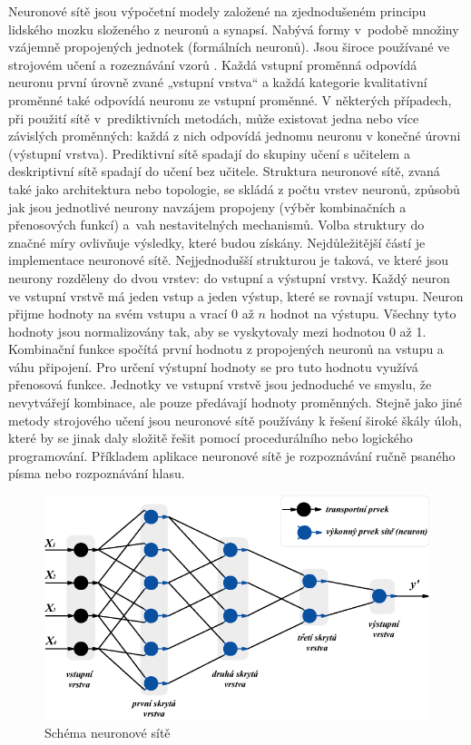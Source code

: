 \documentclass[12pt]{article}
\begin{document}
Neuronové sítě  jsou výpočetní modely založené na zjednodušeném principu lidského mozku složeného z neuronů a synapsí. Nabývá formy v~podobě množiny vzájemně propojených jednotek (formálních neuronů). Jsou široce používané ve strojovém učení a rozeznávání vzorů \citep{bishop}. Každá vstupní proměnná odpovídá neuronu první úrovně zvané „vstupní vrstva“ a každá kategorie kvalitativní proměnné také odpovídá neuronu
ze vstupní proměnné. V některých případech, při použití sítě v~prediktivních metodách,
může existovat jedna nebo více závislých proměnných: každá z nich odpovídá jednomu
neuronu v konečné úrovni (výstupní vrstva). Prediktivní sítě spadají do skupiny
učení s učitelem a deskriptivní sítě spadají do učení bez učitele. 
\newline
\indent
Struktura neuronové sítě, zvaná také jako architektura nebo topologie, se skládá z počtu
vrstev neuronů, způsobů jak jsou jednotlivé neurony navzájem propojeny (výběr kombinačních
a přenosových funkcí) a~vah nestavitelných mechanismů. Volba struktury do
značné míry ovlivňuje výsledky, které budou získány. Nejdůležitější částí je implementace
neuronové sítě. Nejjednodušší strukturou je taková, ve které jsou neurony rozděleny
do dvou vrstev: do vstupní a výstupní vrstvy. Každý neuron ve vstupní vrstvě má
jeden vstup a jeden výstup, které se rovnají vstupu. Neuron přijme hodnoty
na svém vstupu a vrací $0$ až $n$ hodnot na výstupu. Všechny tyto hodnoty jsou normalizovány
tak, aby se vyskytovaly mezi hodnotou 0 až 1. Kombinační funkce spočítá první
hodnotu z propojených neuronů na vstupu a váhu připojení. Pro určení výstupní hodnoty se pro tuto hodnotu využívá přenosová funkce. Jednotky ve vstupní vrstvě jsou jednoduché ve smyslu, že nevytvářejí kombinace, ale pouze předávají
hodnoty proměnných. \citep{tuffery}
\newline
\indent
Stejně jako jiné metody strojového učení jsou neuronové sítě používány k řešení široké škály úloh, které by se jinak daly složitě řešit pomocí procedurálního nebo logického programování. Příkladem aplikace neuronové sítě je rozpoznávání ručně psaného písma nebo rozpoznávání hlasu.
\begin{figure}[!hbt]
  \centering
  \includegraphics[scale=0.7]{img/struktura_site.png}
  \caption{Schéma neuronové sítě \citep{neuronobr}}
\end{figure}
\end{document}
